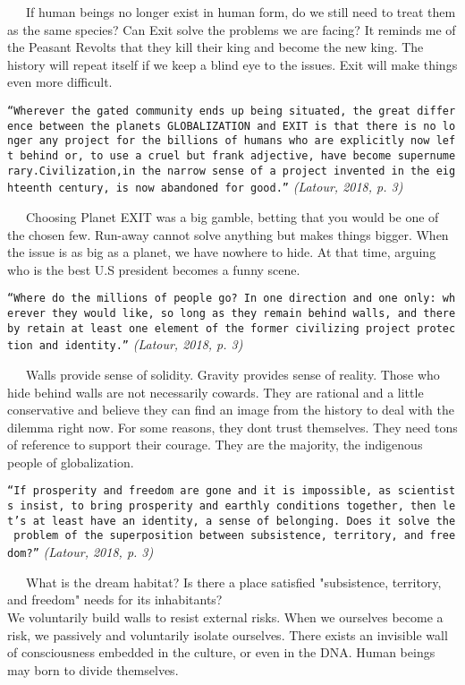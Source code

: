 \documentclass[
]{article}
\begin{document}
~~~If human beings no longer exist in human form, do we still need to
treat them as the same species? Can Exit solve the problems we are
facing? It reminds me of the Peasant Revolts that they kill their king
and become the new king. The history will repeat itself if we keep a
blind eye to the issues. Exit will make things even more difficult.

\texttt{“Wherever\ the\ gated\ community\ ends\ up\ being\ situated,\ the\ great\ difference\ between\ the\ planets\ GLOBALIZATION\ and\ EXIT\ is\ that\ there\ is\ no\ longer\ any\ project\ for\ the\ billions\ of\ humans\ who\ are\ explicitly\ now\ left\ behind\ or,\ to\ use\ a\ cruel\ but\ frank\ adjective,\ have\ become\ supernumerary.Civilization,in\ the\ narrow\ sense\ of\ a\ project\ invented\ in\ the\ eighteenth\ century,\ is\ now\ abandoned\ for\ good.”}
\emph{(Latour, 2018, p. 3)}

~~~Choosing Planet EXIT was a big gamble, betting that you would be one
of the chosen few. Run-away cannot solve anything but makes things
bigger. When the issue is as big as a planet, we have nowhere to hide.
At that time, arguing who is the best U.S president becomes a funny
scene.

\texttt{“Where\ do\ the\ millions\ of\ people\ go?\ In\ one\ direction\ and\ one\ only:\ wherever\ they\ would\ like,\ so\ long\ as\ they\ remain\ behind\ walls,\ and\ thereby\ retain\ at\ least\ one\ element\ of\ the\ former\ civilizing\ project\ protection\ and\ identity.”}
\emph{(Latour, 2018, p. 3)}

~~~Walls provide sense of solidity. Gravity provides sense of reality.
Those who hide behind walls are not necessarily cowards. They are
rational and a little conservative and believe they can find an image
from the history to deal with the dilemma right now. For some reasons,
they don\textquotesingle t trust themselves. They need tons of reference
to support their courage. They are the majority, the indigenous people
of globalization.

\texttt{“If\ prosperity\ and\ freedom\ are\ gone\ and\ it\ is\ impossible,\ as\ scientists\ insist,\ to\ bring\ prosperity\ and\ earthly\ conditions\ together,\ then\ let’s\ at\ least\ have\ an\ identity,\ a\ sense\ of\ belonging.\ Does\ it\ solve\ the\ problem\ of\ the\ superposition\ between\ subsistence,\ territory,\ and\ freedom?”}
\emph{(Latour, 2018, p. 3)}

~~~What is the dream habitat? Is there a place satisfied "subsistence,
territory, and freedom" needs for its inhabitants?\\
We voluntarily build walls to resist external risks. When we ourselves
become a risk, we passively and voluntarily isolate ourselves. There
exists an invisible wall of consciousness embedded in the culture, or
even in the DNA. Human beings may born to divide themselves.
\end{document}
